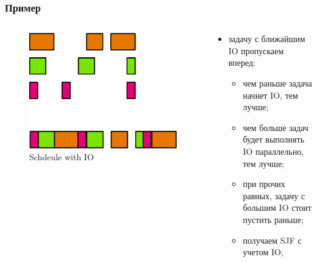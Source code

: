 \begin{frame}
\frametitle{Пример}

\begin{columns}[T]
  \begin{column}{.4\textwidth}
    \begin{figure}
      \centering\includegraphics[width=1.0\linewidth]{iosched1}
      \caption{Schdeule with IO}
    \end{figure}
  \end{column}
  \begin{column}{.6\textwidth}
    \begin{itemize}
      \item задачу с ближайшим IO пропускаем вперед:
        \begin{itemize}
          \item чем раньше задача начнет IO, тем лучше;
          \item чем больше задач будет выполнять IO параллельно, тем лучше;
          \item при прочих равных, задачу с большим IO стоит пустить раньше;
          \item получаем SJF с учетом IO;
        \end{itemize}
    \end{itemize}
  \end{column}
\end{columns}
\end{frame}

